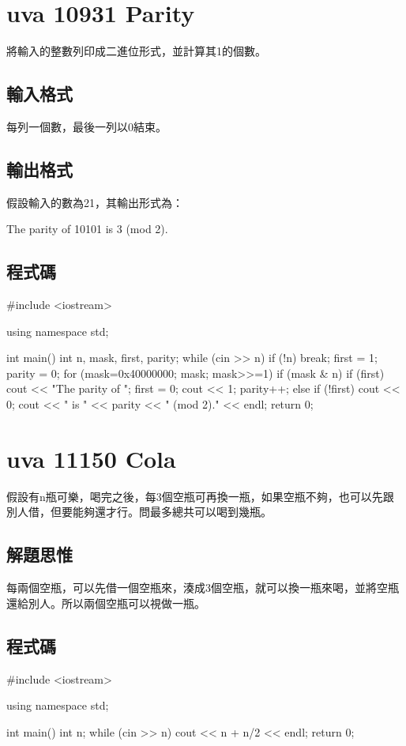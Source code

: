 \section{uva 10931 Parity}
將輸入的整數列印成二進位形式，並計算其1的個數。
\subsection{輸入格式}
每列一個數，最後一列以0結束。
\subsection{輸出格式}
假設輸入的數為21，其輸出形式為：
\begin{inside}
The parity of 10101 is 3 (mod 2).
\end{inside}

\subsection{程式碼}
\begin{cppcode}
#include <iostream>

using namespace std;

int main()
{
	int n, mask, first, parity;
	while (cin >> n) {
		if (!n) break;
		first = 1; parity = 0;
		for (mask=0x40000000; mask; mask>>=1) {
			if (mask & n) {
				if (first) { cout << "The parity of "; first = 0; }
				cout << 1;
				parity++;
			} else if (!first) cout << 0;
		}
		cout << " is " << parity << " (mod 2)." << endl;
	}
	return 0;
}
\end{cppcode}

\section{uva 11150 Cola}
假設有n瓶可樂，喝完之後，每3個空瓶可再換一瓶，如果空瓶不夠，也可以先跟別人借，但要能夠還才行。問最多總共可以喝到幾瓶。
\subsection{解題思惟}
每兩個空瓶，可以先借一個空瓶來，湊成3個空瓶，就可以換一瓶來喝，並將空瓶還給別人。所以兩個空瓶可以視做一瓶。
\subsection{程式碼}
\begin{cppcode}
#include <iostream>

using namespace std;

int main()
{
	int n;
	while (cin >> n) cout << n + n/2 << endl;
	return 0;
}	
\end{cppcode}

